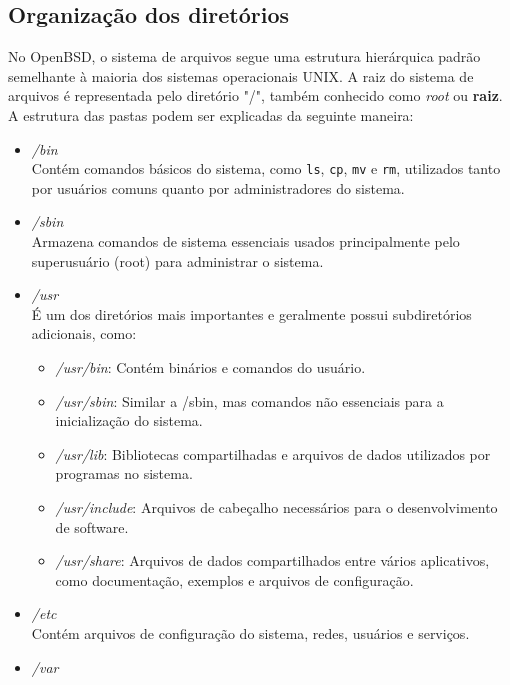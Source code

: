 \documentclass[a4paper,10pt]{article}
\begin{document}
\subsection{Organização dos diretórios}
No OpenBSD, o sistema de arquivos segue uma estrutura hierárquica padrão semelhante à maioria dos sistemas operacionais UNIX. A raiz do sistema de arquivos é representada pelo diretório "/", também conhecido como \textit{root} ou \textbf{raiz}.
A estrutura das pastas podem ser explicadas da seguinte maneira:
\begin{itemize}
    \item \textit{/bin} \\
    Contém comandos básicos do sistema, como \verb|ls|, \verb|cp|, \verb|mv| e \verb|rm|, utilizados tanto por usuários comuns quanto por administradores do sistema.
    \item \textit{/sbin} \\
    Armazena comandos de sistema essenciais usados principalmente pelo superusuário (root) para administrar o sistema.
    \item \textit{/usr} \\
    É um dos diretórios mais importantes e geralmente possui subdiretórios adicionais, como:
    \begin{itemize}
        \item \textit{/usr/bin}: Contém binários e comandos do usuário.
        \item \textit{/usr/sbin}: Similar a /sbin, mas comandos não essenciais para a inicialização do sistema.
        \item \textit{/usr/lib}: Bibliotecas compartilhadas e arquivos de dados utilizados por programas no sistema.
        \item \textit{/usr/include}: Arquivos de cabeçalho necessários para o desenvolvimento de software.
        \item \textit{/usr/share}: Arquivos de dados compartilhados entre vários aplicativos, como documentação, exemplos e arquivos de configuração.
    \end{itemize}
    \item \textit{/etc} \\
    Contém arquivos de configuração do sistema, redes, usuários e serviços.
    \item \textit{/var} \\

\end{itemize}
\end{document}
